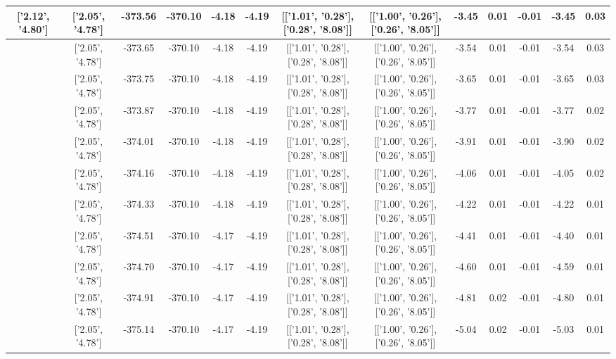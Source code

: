 \begin{table}[htbp]
\begin{adjustbox}{angle=90}
\begin{tabular}{|c|c|c|c|c|c|c|c|c|c|c|c|c|}
 ['2.12', '4.80'] & ['2.05', '4.78'] & -373.56 & -370.10 & -4.18 & -4.19 & [['1.01', '0.28'], ['0.28', '8.08']] & [['1.00', '0.26'], ['0.26', '8.05']] & -3.45 & 0.01 & -0.01 & -3.45 & 0.03\\ \hline
 ['2.13', '4.80'] & ['2.05', '4.78'] & -373.65 & -370.10 & -4.18 & -4.19 & [['1.01', '0.28'], ['0.28', '8.08']] & [['1.00', '0.26'], ['0.26', '8.05']] & -3.54 & 0.01 & -0.01 & -3.54 & 0.03\\ \hline
 ['2.14', '4.80'] & ['2.05', '4.78'] & -373.75 & -370.10 & -4.18 & -4.19 & [['1.01', '0.28'], ['0.28', '8.08']] & [['1.00', '0.26'], ['0.26', '8.05']] & -3.65 & 0.01 & -0.01 & -3.65 & 0.03\\ \hline
 ['2.15', '4.80'] & ['2.05', '4.78'] & -373.87 & -370.10 & -4.18 & -4.19 & [['1.01', '0.28'], ['0.28', '8.08']] & [['1.00', '0.26'], ['0.26', '8.05']] & -3.77 & 0.01 & -0.01 & -3.77 & 0.02\\ \hline
 ['2.16', '4.81'] & ['2.05', '4.78'] & -374.01 & -370.10 & -4.18 & -4.19 & [['1.01', '0.28'], ['0.28', '8.08']] & [['1.00', '0.26'], ['0.26', '8.05']] & -3.91 & 0.01 & -0.01 & -3.90 & 0.02\\ \hline
 ['2.17', '4.81'] & ['2.05', '4.78'] & -374.16 & -370.10 & -4.18 & -4.19 & [['1.01', '0.28'], ['0.28', '8.08']] & [['1.00', '0.26'], ['0.26', '8.05']] & -4.06 & 0.01 & -0.01 & -4.05 & 0.02\\ \hline
 ['2.19', '4.81'] & ['2.05', '4.78'] & -374.33 & -370.10 & -4.18 & -4.19 & [['1.01', '0.28'], ['0.28', '8.08']] & [['1.00', '0.26'], ['0.26', '8.05']] & -4.22 & 0.01 & -0.01 & -4.22 & 0.01\\ \hline
 ['2.20', '4.81'] & ['2.05', '4.78'] & -374.51 & -370.10 & -4.17 & -4.19 & [['1.01', '0.28'], ['0.28', '8.08']] & [['1.00', '0.26'], ['0.26', '8.05']] & -4.41 & 0.01 & -0.01 & -4.40 & 0.01\\ \hline
 ['2.21', '4.82'] & ['2.05', '4.78'] & -374.70 & -370.10 & -4.17 & -4.19 & [['1.01', '0.28'], ['0.28', '8.08']] & [['1.00', '0.26'], ['0.26', '8.05']] & -4.60 & 0.01 & -0.01 & -4.59 & 0.01\\ \hline
 ['2.22', '4.82'] & ['2.05', '4.78'] & -374.91 & -370.10 & -4.17 & -4.19 & [['1.01', '0.28'], ['0.28', '8.08']] & [['1.00', '0.26'], ['0.26', '8.05']] & -4.81 & 0.02 & -0.01 & -4.80 & 0.01\\ \hline
 ['2.23', '4.82'] & ['2.05', '4.78'] & -375.14 & -370.10 & -4.17 & -4.19 & [['1.01', '0.28'], ['0.28', '8.08']] & [['1.00', '0.26'], ['0.26', '8.05']] & -5.04 & 0.02 & -0.01 & -5.03 & 0.01\\ \hline

\end{tabular}
\end{adjustbox}
\end{table}
